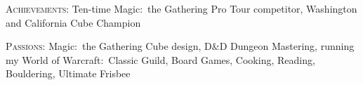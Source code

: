 \documentclass[letterpaper,10pt]{article} %
\begin{document}
\textsc{Achievements:} Ten-time Magic:\ the Gathering Pro Tour competitor, Washington and California Cube Champion

\textsc{Passions:} Magic:\ the Gathering Cube design, D\&D Dungeon Mastering, running my World of Warcraft:\ Classic Guild, Board Games, Cooking, Reading, Bouldering, Ultimate Frisbee







\end{document}
